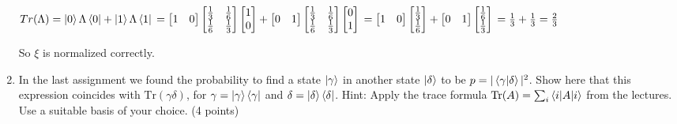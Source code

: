 \documentclass{article}
\begin{document}
\begin{enumerate}
          $Tr(\Lambda) = \ket{0}\Lambda\bra{0}+\ket{1}\Lambda\bra{1}
              \\= \begin{bmatrix}
                  1 & 0
              \end{bmatrix}\begin{bmatrix}
                  \frac{1}{3} & \frac{1}{6} \\
                  \frac{1}{6} & \frac{1}{3}
              \end{bmatrix}\begin{bmatrix}
                  1 \\
                  0
              \end{bmatrix}+\begin{bmatrix}
                  0 & 1
              \end{bmatrix}\begin{bmatrix}
                  \frac{1}{3} & \frac{1}{6} \\
                  \frac{1}{6} & \frac{1}{3}
              \end{bmatrix}\begin{bmatrix}
                  0 \\
                  1
              \end{bmatrix}
              \\= \begin{bmatrix}
                  1 & 0
              \end{bmatrix}\begin{bmatrix}
                  \frac{1}{3} \\
                  \frac{1}{6}
              \end{bmatrix}+\begin{bmatrix}
                  0 & 1
              \end{bmatrix}\begin{bmatrix}
                  \frac{1}{6} \\
                  \frac{1}{3}
              \end{bmatrix}
              \\= \frac{1}{3}+\frac{1}{3}
              \\= \frac{2}{3}$

          So $\xi$ is normalized correctly.


    \item In the last assignment we found the probability to find a state $\ket{\gamma}$ in another state $\ket{\delta}$ to be $p = |\braket{\gamma|\delta}|^2$. Show here that this expression coincides with $\mathrm{Tr}(\gamma\delta)$, for $\gamma = \ket{\gamma}\bra{\gamma}$ and $\delta = \ket{\delta}\bra{\delta}$. Hint: Apply the trace formula $\mathrm{Tr}(A) = \sum_i \braket{i|A|i}$ from the lectures. Use a suitable basis of your choice. (4 points)


\end{enumerate}
\end{document}
